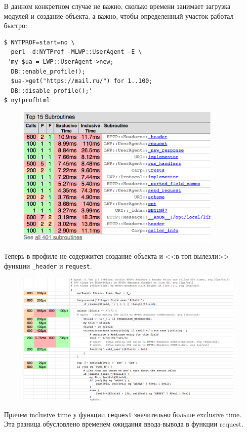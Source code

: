 В данном конкретном случае не важно, сколько времени занимает загрузка модулей и создание объекта, а важно, чтобы определенный участок работал быстро:
\begin{verbatim}
$ NYTPROF=start=no \
  perl -d:NYTProf -MLWP::UserAgent -E \
 'my $ua = LWP::UserAgent->new;
  DB::enable_profile();
  $ua->get("https://mail.ru/") for 1..100;
  DB::disable_profile();'
$ nytprofhtml
\end{verbatim}
\begin{figure}[H] %
	\centering
	\includegraphics[width=10cm]{lectures/L12/nyt3.png}
\end{figure}
Теперь в профиле не содержится создание объекта и <<в топ вылезли>> функции \verb|_header| и \verb|request|. 
\begin{figure}[H] %
	\centering
	\includegraphics[width=13cm]{lectures/L12/nyt4.png}
\end{figure}
Причем inclusive time у функции \verb|request| значительно больше exclusive time. Эта разница обусловлено временем ожидания ввода-вывода в функции request.

